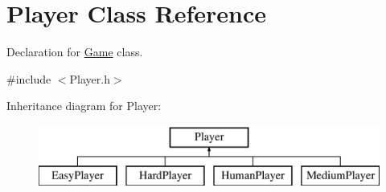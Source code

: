 \hypertarget{class_player}{}\section{Player Class Reference}
\label{class_player}


Declaration for \mbox{\hyperlink{class_game}{Game}} class.  




{\ttfamily \#include $<$Player.\+h$>$}

Inheritance diagram for Player\+:\begin{figure}[H]
\begin{center}
\leavevmode
\includegraphics[height=2.000000cm]{class_player}
\end{center}
\end{figure}
